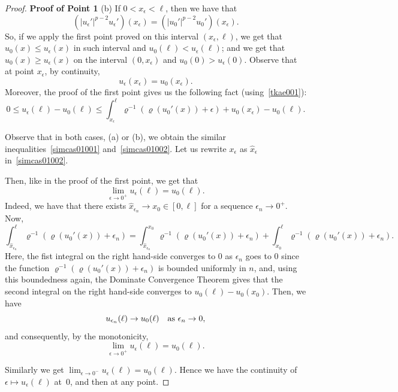 \documentclass[reqno,12pt]{amsart}
\numberwithin{equation}{section} %
\begin{document}
\begin{proof}  {\bf Proof of Point 1}
\noindent (b) If 
  $0<x_\epsilon<\ell$, then we have that
$$(|u_\epsilon'|^{p-2}u_\epsilon')(x_\epsilon)=(|u_0'|^{p-2}u_0')(x_\epsilon).$$
So, if
we apply the first point proved on this interval $(x_\epsilon,\ell)$,  we get that $u_0(x)\le u_\epsilon(x)$ in such interval and $u_0(\ell)< u_\epsilon(\ell)$; and we get that $u_0(x)\ge u_\epsilon(x)$ on the interval $(0,x_\epsilon)$ and $u_0(0)> u_\epsilon(0)$.
Observe that at point $x_\epsilon$, by continuity,
\begin{equation}\label{tkae001} u_\epsilon(x_\epsilon)=u_0(x_\epsilon).
\end{equation}
 Moreover, the proof of  the first point gives us the following fact  (using~\eqref{tkae001}): 
\begin{equation}\label{simcas01002}0\le u_\epsilon(\ell)-u_0(\ell)\le \int_{x_\epsilon}^\ell\varrho^{-1}\left(\varrho(u_0'(x))+\epsilon\right)+u_0(x_\epsilon)-u_0(\ell).
\end{equation}


 Observe that in both cases, (a) or (b), we obtain the similar inequalities~\eqref{simcas01001} and~\eqref{simcas01002}. Let us rewrite $x_\epsilon$ as $\widehat x_\epsilon$ in~\eqref{simcas01002}.

Then, like in the proof of the first point,  we get that
$$\lim_{\epsilon\to 0^+}u_\epsilon(\ell)=u_0(\ell).$$
 Indeed, we have that there exists $\widehat x_{\epsilon_n}\to x_0\in[0,\ell]$ for a sequence $\epsilon_n\to 0^+$. 
 Now,
$$
\int_{\widehat x_{\epsilon_n}}^\ell\varrho^{-1}\left(\varrho(u_0'(x))+\epsilon_n\right)=\int_{\widehat x_{\epsilon_n}}^{x_0}\varrho^{-1}\left(\varrho(u_0'(x))+\epsilon_n\right)+\int_{x_0}^\ell\varrho^{-1}\left(\varrho(u_0'(x))+\epsilon_n\right).
$$
Here, the fist integral on the right hand-side converges to $0$ as $\epsilon_n$ goes to $0$ since  the function $\varrho^{-1}\left(\varrho(u_0'(x))+\epsilon_n\right)$ is bounded uniformly in $n$, and, using this boundedness again,  the Dominate Convergence Theorem gives that the second integral on the right hand-side converges to $u_0(\ell)-u_0(x_0)$.  Then, we have
$$u_{\epsilon_n}(\ell)\to u_0(\ell)\quad\hbox{as }\epsilon_n\to 0,$$ 
and consequently, by the monotonicity,
$$\lim_{\epsilon\to 0^+}u_\epsilon(\ell)=u_0(\ell).$$


Similarly we get $\lim_{\epsilon\to 0^-}u_\epsilon(\ell)=u_0(\ell).$ 
Hence we have the  continuity of $\epsilon\mapsto u_\epsilon(\ell)$  at~$0$, and then at any point.
\end{proof}
\end{document}
